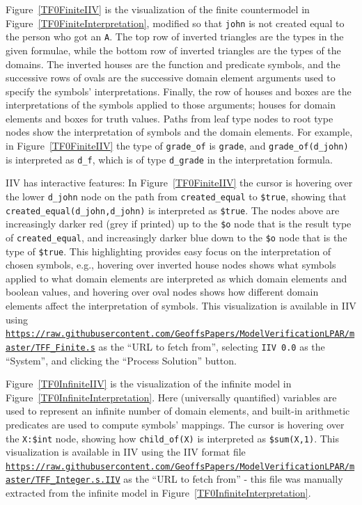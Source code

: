 \documentclass{easychair}
\newcommand{\smalltt}[1]{\small \texttt{#1}}
\begin{document}
Figure~\ref{TF0FiniteIIV} is the visualization of the finite countermodel in 
Figure~\ref{TF0FiniteInterpretation}, modified so that {\smalltt{john}} is not created equal 
to the person who got an {\smalltt{A}}.
The top row of inverted triangles are the types in the given formulae,
while the bottom row of inverted triangles are the types of the domains.
The inverted houses are the function and predicate symbols, and the successive rows of ovals are 
the successive domain element arguments used to specify the symbols' interpretations.
Finally, the row of houses and boxes are the interpretations of the symbols applied to those
arguments; houses for domain elements and boxes for truth values.
Paths from leaf type nodes to root type nodes show the interpretation of symbols and the domain
elements.
For example, in Figure~\ref{TF0FiniteIIV} the type of {\smalltt{grade\_of}} is {\smalltt{grade}},
and {\smalltt{grade\_of(d\_john)}} is interpreted as {\smalltt{d\_f}}, which is of type
{\smalltt{d\_grade}} in the interpretation formula.

IIV has interactive features: In Figure~\ref{TF0FiniteIIV} the cursor is hovering over 
the lower {\smalltt{d\_john}} node on the path from {\smalltt{created\_equal}} to 
{\smalltt{\$true}}, showing that {\smalltt{created\_equal(d\_john,d\_john)}} is interpreted as 
{\smalltt{\$true}}.
The nodes above are increasingly darker red (grey if printed) up to the {\smalltt{\$o}} node
that is the result type of {\smalltt{created\_equal}}, and increasingly darker blue down to 
the {\smalltt{\$o}} node that is the type of {\smalltt{\$true}}.
This highlighting provides easy focus on the interpretation of chosen symbols, e.g., hovering
over inverted house nodes shows what symbols applied to what domain elements are interpreted as 
which domain elements and boolean values, and hovering over oval nodes shows how different domain 
elements affect the interpretation of symbols.
This visualization is available in IIV using 
{\smalltt{\url{https://raw.githubusercontent.com/GeoffsPapers/ModelVerificationLPAR/master/TFF_Finite.s}}}
as the ``URL to fetch from'',
selecting {\tt IIV 0.0} as the ``System'', and clicking the ``Process Solution'' button.

Figure~\ref{TF0InfiniteIIV} is the visualization of the infinite model in 
Figure~\ref{TF0InfiniteInterpretation}. 
Here (universally quantified) variables are used to represent an infinite number of
domain elements, and built-in arithmetic predicates are used to compute symbols' mappings.
The cursor is hovering over the {\smalltt{X:\$int}} node, showing how 
{\smalltt{child\_of(X)}} is interpreted as {\smalltt{\$sum(X,1)}}.
This visualization is available in IIV using the IIV format file
{\smalltt{\url{https://raw.githubusercontent.com/GeoffsPapers/ModelVerificationLPAR/master/TFF_Integer.s.IIV}}}
as the ``URL to fetch from'' - this file was manually extracted from the infinite model in 
Figure~\ref{TF0InfiniteInterpretation}.
\end{document}
